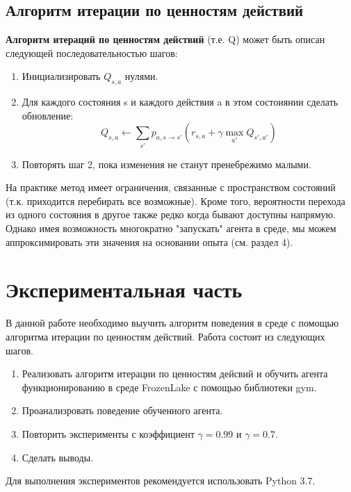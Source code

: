 \documentclass[fleqn, a4paper, 14pt]{article}
\begin{document}
	\subsection{Алгоритм итерации по ценностям действий}
%		
%		
%		
%		
	
	
	\textbf{Алгоритм итераций по ценностям действий} (т.е. Q) может быть описан следующей последовательностью шагов:
	
	\begin{enumerate}
		
		\item Инициализировать $ Q_{s,a} $ нулями.
		
		\item Для каждого состояния s и каждого действия a в этом состоиянии сделать обновление: 
		\begin{equation}
		Q_{s,a} \leftarrow \sum_{s'}p_{a,s \rightarrow s'}(r_{s,a} + \gamma \max_{a'}Q_{s',a'})
		\label{eq:bell_upd}
		\end{equation}
		\item Повторять шаг 2, пока изменения не станут пренебрежимо малыми.
		
	\end{enumerate}
	На практике метод имеет ограничения, связанные с пространством состояний (т.к. приходится перебирать все возможные). Кроме того, вероятности перехода из одного состояния в другое также редко когда бывают доступны напрямую. Однако имея возможность многократно "запускать" агента в среде, мы можем аппроксимировать эти значения на основании опыта (см. раздел 4).
	 
	\section{Экспериментальная часть}
	В данной работе необходимо выучить алгоритм поведения в среде с помощью алгоритма итерации по ценностям действий. Работа состоит из следующих шагов.
	\begin{enumerate}
	\item Реализовать алгоритм итерации по ценностям дейсвий и обучить агента функционированию в среде FrozenLake с помощью библиотеки gym. 
	\item Проанализровать поведение обученного агента.
	\item Повторить эксперименты с коэффициент $ \gamma  = 0.99$ и $ \gamma  = 0.7$. 
	\item Сделать выводы.
	\end{enumerate}
	Для выполнения экспериментов рекомендуется использовать Python 3.7. 
\end{document}
